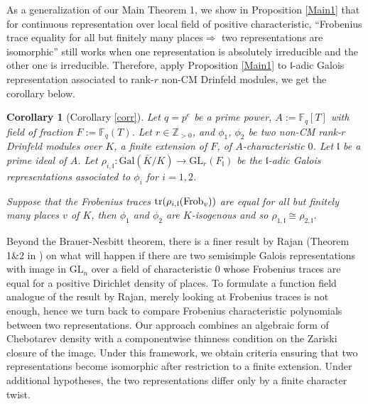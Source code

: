 \documentclass[20pt, oneside]{article}   	%
\newtheorem*{corr}{Corollary}
\theoremstyle{definition}
\newcommand{\F}{\mathbb{F}}
\newcommand{\fl}{\mathfrak{l}}
\newcommand{\Gal}{\mathrm{Gal}}
\newcommand{\GL}{\mathrm{GL}}
\begin{document}
As a generalization of our Main Theorem 1, we show in Proposition \ref{Main1} that for continuous representation over local field of positive characteristic, ``Frobenius trace equality for all but finitely many places$\Rightarrow$ two representations are isomorphic'' still  works when one representation is absolutely irreducible and the other one is irreducible. Therefore, apply Proposition \ref{Main1} to $\fl$-adic Galois representation associated to rank-$r$ non-CM Drinfeld modules, we get the corollary below.

\begin{corr}[Corollary \ref{corr}]
Let $q=p^e$ be a prime power, $A:=\F_q[T]$ with field of fraction $F:=\F_q(T)$. Let $r\in \mathbb{Z}_{>0}$, and $\phi_1$, $\phi_2$ be two non-CM rank-$r$ Drinfeld modules over $K$, a finite extension of $F$, of $A$-characteristic $0$. Let $\fl$ be a prime ideal of $A$. Let $\rho_{i,\fl}:\Gal(\bar{K}/K)\rightarrow \GL_r(F_\fl)$  be the $\fl$-adic Galois representations associated to $\phi_i$ for $i=1,2$. 

Suppose that the Frobenius traces ${\rm{tr}}(\rho_{i,\fl}({\rm Frob}_{v}))$ are equal for all but finitely many places $v$ of $K$, then
$\phi_1$ and $\phi_2$ are $K$-isogenous and so $\rho_{1,\fl}\cong\rho_{2,\fl}$.


\end{corr}

Beyond the Brauer-Nesbitt theorem, there is a finer result by Rajan (Theorem 1\&2 in \cite{Ra98}) on what will happen if there are two semisimple Galois representations with image in $\GL_n$ over a field of characteristic $0$ whose Frobenius traces are equal for a positive Dirichlet density of places. To formulate a function field analogue of the result by Rajan, merely looking at Frobenius traces is not enough, hence we turn back to compare Frobenius characteristic polynomials between two representations. Our approach combines an algebraic form of Chebotarev density with a componentwise thinness condition on the Zariski closure of the image. Under this framework, we obtain criteria ensuring that two representations become isomorphic after restriction to a finite extension. Under additional hypotheses, the two representations differ only by a finite character twist.
\end{document}
